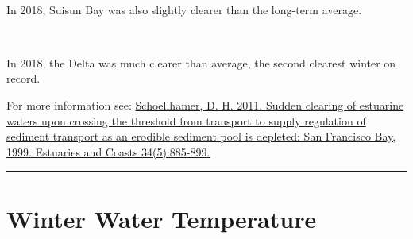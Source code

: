 \documentclass[
]{book}
\begin{document}
\begin{panel-grid}
\begin{columns-nocenter}
\begin{column40}
~

\end{column40}

\begin{column800}

In 2018, Suisun Bay was also slightly clearer than the long-term average.

\end{column800}

\begin{column40}

~

\end{column40}

\begin{column800}

In 2018, the Delta was much clearer than average, the second clearest winter on record.

\end{column800}

\end{columns-nocenter}

\end{panel-grid}

\begin{disclaimer}
For more information see:
\href{https://link.springer.com/article/10.1007/s12237-011-9382-x}{Schoellhamer,
D. H. 2011. Sudden clearing of estuarine waters upon crossing the
threshold from transport to supply regulation of sediment transport as
an erodible sediment pool is depleted: San Francisco Bay, 1999.
Estuaries and Coasts 34(5):885-899.}
\end{disclaimer}

\begin{center}\rule{0.5\linewidth}{0.5pt}\end{center}

\hypertarget{winter-water-temperature}{%
\section{Winter Water Temperature}\label{winter-water-temperature}}
\end{document}
